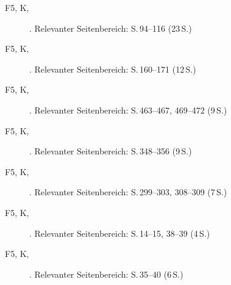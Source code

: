 \begin{description}
  \item[F5, K, \cite{muellerboeschschaffnermenn2021udl}] . Relevanter Seitenbereich: S.\,94--116 (23\,S.)
  \item[F5, K, \cite{macha2019gender}] . Relevanter Seitenbereich: S.\,160--171 (12\,S.)
  \item[F5, K, \cite{groschefussangelgraesel2020kokonstruktion}] . Relevanter Seitenbereich: S.\,463--467, 469--472 (9\,S.)
  \item[F5, K, \cite{nguyensliwka2021massnahmen}] . Relevanter Seitenbereich: S.\,348--356 (9\,S.)
  \item[F5, K, \cite{widmerwolf2018multiprofessionell}] . Relevanter Seitenbereich: S.\,299--303, 308--309 (7\,S.)
  \item[F5, K, \cite{kosoroklabhart2021voneltern}] . Relevanter Seitenbereich: S.\,14--15, 38--39 (4\,S.)
  \item[F5, K, \cite{baudson2025besserfinden}] . Relevanter Seitenbereich: S.\,35--40 (6\,S.)
\end{description}
